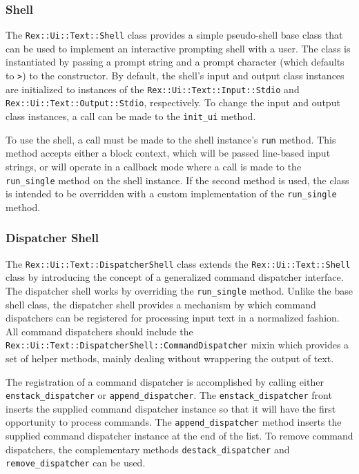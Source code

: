 \documentclass{report}
\begin{document}
            \subsubsection{Shell}

\par
The \texttt{Rex::Ui::Text::Shell} class provides a simple
pseudo-shell base class that can be used to implement an interactive
prompting shell with a user.  The class is instantiated by passing a
prompt string and a prompt character (which defaults to \verb#>#) to
the constructor.  By default, the shell's input and output class
instances are initialized to instances of the
\texttt{Rex::Ui::Text::Input::Stdio} and
\texttt{Rex::Ui::Text::Output::Stdio}, respectively.  To change the
input and output class instances, a call can be made to the
\texttt{init\_ui} method.

\par
To use the shell, a call must be made to the shell instance's
\texttt{run} method.  This method accepts either a block context,
which will be passed line-based input strings, or will operate in a
callback mode where a call is made to the \texttt{run\_single}
method on the shell instance.  If the second method is used, the
class is intended to be overridden with a custom implementation of
the \texttt{run\_single} method.

            \subsubsection{Dispatcher Shell}

\par
The \texttt{Rex::Ui::Text::DispatcherShell} class extends the
\texttt{Rex::Ui::Text::Shell} class by introducing the concept of a
generalized command dispatcher interface.  The dispatcher shell
works by overriding the \texttt{run\_single} method.  Unlike the
base shell class, the dispatcher shell provides a mechanism by which
command dispatchers can be registered for processing input text in a
normalized fashion.  All command dispatchers should include the
\texttt{Rex::Ui::Text::DispatcherShell::CommandDispatcher} mixin
which provides a set of helper methods, mainly dealing without
wrappering the output of text.

\par
The registration of a command dispatcher is accomplished by calling
either \texttt{enstack\_dispatcher} or \texttt{append\_dispatcher}.
The \texttt{enstack\_dispatcher} front inserts the supplied command
dispatcher instance so that it will have the first opportunity to
process commands.  The \texttt{append\_dispatcher} method inserts
the supplied command dispatcher instance at the end of the list.  To
remove command dispatchers, the complementary methods
\texttt{destack\_dispatcher} and \texttt{remove\_dispatcher} can be
used.
\end{document}
